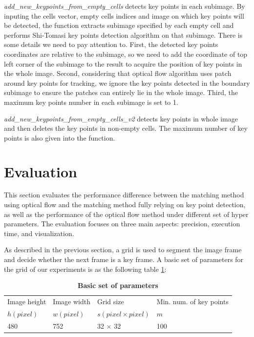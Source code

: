 \documentclass[11pt]{easychair}
\begin{document}
\emph{add\_new\_keypoints\_from\_empty\_cells} detects key points in each subimage. By inputing the cells vector, empty cells indices and image on which key points will be detected, the function extracts subimage specified by each empty cell and performs Shi-Tomasi key points detection algorithm on that subimage. There is some details we need to pay attention to. First, the detected key points coordinates are relative to the subimage, so we need to add the coordinate of top left corner of the subimage to the result to acquire the position of key points in the whole image. Second, considering that optical flow algorithm uses patch around key points for tracking, we ignore the key points detected in the boundary subimage to ensure the patches can entirely lie in the whole image. Third, the maximum key points number in each subimage is set to 1.

\emph{add\_new\_keypoints\_from\_empty\_cells\_v2} detects key points in whole image and then deletes the key points in non-empty cells. The maximum number of key points is also given into the function.

\section{Evaluation}
This section evaluates the performance difference between the matching method using optical flow and the matching method fully relying on key point detection, as well as the performance of the optical flow method under different set of hyper parameters. The evaluation focuses on three main aspects: precision, execution time, and visualization.

As described in the previous section, a grid is used to segment the image frame and decide whether the next frame is a key frame. A basic set of parameters for the grid of our experiments is as the following table \ref{tab:basicset}:


\begin{table}[h!]
	\begin{center}
		\caption{\textbf{Basic set of parameters}}
		\label{tab:basicset}
		\begin{tabular}{llll} %
			Image height & Image width & Grid size& Min. num. of key points\\
			$h (pixel)$ & $w (pixel)$ & $s (pixel\times pixel)$ & $m$ \\
			\hline
			480 & 752 & 32 $\times$ 32 & 100 \\
			
		\end{tabular}
	\end{center}
\end{table}
\end{document}

